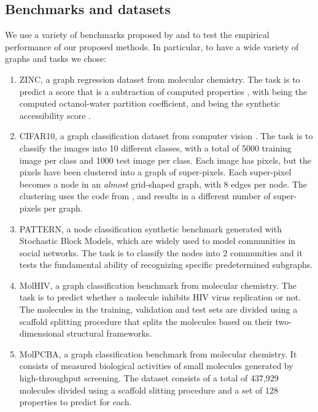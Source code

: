 \documentclass{article} \usepackage{arxiv,times}
\begin{document}
\subsection{Benchmarks and datasets}
\label{app:benchmarks}
We use a variety of benchmarks proposed by \cite{dwivedi2020benchmarking} and \cite{hu2020open} to test the empirical performance of our proposed methods. In particular, to have a wide variety of graphs and tasks we chose: 
\begin{enumerate}
    \item ZINC, a graph regression dataset from molecular chemistry. The task is to predict a score that is a subtraction of computed properties , with  being the computed octanol-water partition coefficient, and  being the synthetic accessibility score \cite{jin_junction_2018}.
    \item CIFAR10, a graph classification dataset from computer vision \cite{krizhevsky_CIFAR10}. The task is to classify the images into 10 different classes, with a total of 5000 training image per class and 1000 test image per class. Each image has  pixels, but the pixels have been clustered into a graph of  super-pixels. Each super-pixel becomes a node in an \textit{almost} grid-shaped graph, with 8 edges per node. The clustering uses the code from \cite{knyazev2019understanding}, and results in a different number of super-pixels per graph. 
    \item PATTERN, a node classification synthetic benchmark generated with Stochastic Block Models, which are widely used to model communities in social networks. The task is to classify the nodes into 2 communities and it tests the fundamental ability of recognizing specific predetermined subgraphs.
    \item MolHIV, a graph classification benchmark from molecular chemistry. The task is to predict whether a molecule inhibits HIV virus replication or not. The molecules in the training, validation and test sets are divided using a scaffold splitting procedure that splits the molecules based on their two-dimensional structural frameworks.
    \item MolPCBA, a graph classification benchmark from molecular chemistry. It consists of measured biological activities of small molecules generated by high-throughput screening. The dataset consists of a total of 437,929 molecules divided using a scaffold slitting procedure and a set of 128 properties to predict for each.
\end{enumerate}
\end{document}
